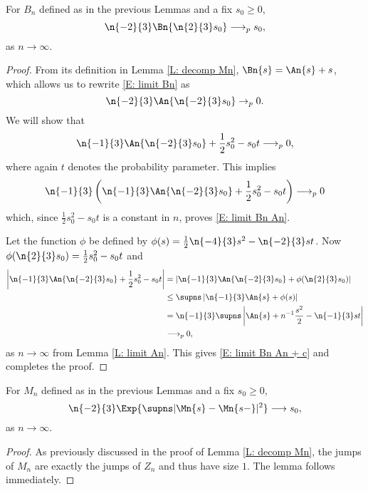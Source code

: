 \begin{lemma} \label{L: limit Bn}
	For $B_n$ defined as in the previous Lemmas and a fix $s_0 \geq 0$,
	\begin{equation} \label{E: limit Bn}
	\n{-2}{3} \Bn{\n{2}{3}s_0} \longrightarrow_p s_0,
	\end{equation}
	as $n \longrightarrow \infty$.
\end{lemma}
\begin{proof} \label{P: limit Bn}
	From its definition in Lemma \ref{L: decomp Mn}, $\Bn{s} = \An{s} + s$, which allows us to rewrite \ref{E: limit Bn} as
	\begin{equation} \label{E: limit Bn An}
	\n{-2}{3} \An{\n{-2}{3}s_0} \rightarrow_p 0.
	\end{equation}
	We will show that
	\begin{equation} \label{E: limit Bn An + c}
	\n{-1}{3} \An{\n{-2}{3}s_0} + \frac{1}{2}s_0^2 - s_0t \longrightarrow_p 0,
	\end{equation}
	where again $t$ denotes the probability parameter. 
	This implies
	\begin{equation*}
	\n{-1}{3} \left( \n{-1}{3} \An{\n{-2}{3}s_0} + \frac{1}{2}s_0^2 - s_0t \right) \longrightarrow_p 0
	\end{equation*}
	which, since $\frac{1}{2}s_0^2 - s_0t$ is a constant in $n$, proves \ref{E: limit Bn An}.
	
	Let the function $\phi$ be defined by $\phi(s) = \frac{1}{2}\n{-4}{3}s^2 - \n{-2}{3}st$.	
	Now $\phi(\n{2}{3}s_0) = \frac{1}{2}s_0^2 - s_0t$ and
	\begin{align*}
	\left| \n{-1}{3} \An{\n{-2}{3}s_0} + \frac{1}{2}s_0^2 - s_0t \right| 
	&= \left| \n{-1}{3} \An{\n{-2}{3}s_0} + \phi(\n{2}{3}s_0) \right| \\
	&\leq \supns \left| \n{-1}{3} \An{s} + \phi(s) \right| \\
	&= \n{-1}{3} \supns \left| \An{s} + n^{-1}\frac{s^2}{2} - \n{-1}{3}st \right| \\
	&\longrightarrow_p 0,
	\end{align*}
	as $n \rightarrow \infty$ from Lemma \ref{L: limit An}. This gives \ref{E: limit Bn An + c} and completes the proof.
\end{proof}

\begin{lemma} \label{L: limit Mn}
	For $M_n$ defined as in the previous Lemmas and a fix $s_0 \geq 0$,
	\begin{equation} \label{E: limit Mn}
	\n{-2}{3} \Exp{\supns |\Mn{s} - \Mn{s-}|^2} \longrightarrow s_0,
	\end{equation}
	as $n\longrightarrow \infty$.
\end{lemma}
\begin{proof} \label{P: limit Mn}
	As previously discussed in the proof of Lemma \ref{L: decomp Mn}, the jumps of $M_n$ are exactly the jumps of $Z_n$ and thus have size $1$. The lemma follows immediately.
\end{proof}

